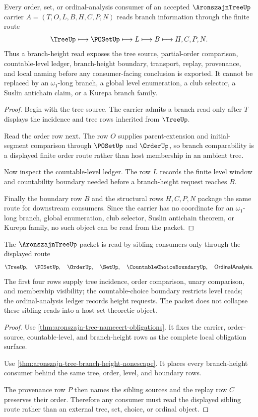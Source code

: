 \begin{theorem}\label{thm:aronszajn-tree-branch-height-nonescape}
Every order, set, or ordinal-analysis consumer of an accepted $\AronszajnTreeUp$ carrier $A=(T,O,L,B,H,C,P,N)$ reads branch information through the finite route
$$
\TreeUp \longmapsto \POSetUp \longmapsto L \longmapsto B \longmapsto H,C,P,N .
$$
Thus a branch-height read exposes the tree source, partial-order comparison, countable-level ledger, branch-height boundary, transport, replay, provenance, and local naming before any consumer-facing conclusion is exported. It cannot be replaced by an $\omega_1$-long branch, a global level enumeration, a club selector, a Suslin antichain claim, or a Kurepa branch family.
\end{theorem}
\begin{proof}
Begin with the tree source. The carrier admits a branch read only after $T$ displays the incidence and tree rows inherited from $\TreeUp$.

Read the order row next. The row $O$ supplies parent-extension and initial-segment comparison through $\POSetUp$ and $\OrderUp$, so branch comparability is a displayed finite order route rather than host membership in an ambient tree.

Now inspect the countable-level ledger. The row $L$ records the finite level window and countability boundary needed before a branch-height request reaches $B$.

Finally the boundary row $B$ and the structural rows $H,C,P,N$ package the same route for downstream consumers. Since the carrier has no coordinate for an $\omega_1$-long branch, global enumeration, club selector, Suslin antichain theorem, or Kurepa family, no such object can be read from the packet.
\end{proof}

\begin{theorem}\label{thm:aronszajn-tree-sibling-route}
The $\AronszajnTreeUp$ packet is read by sibling consumers only through the displayed route
$$
\TreeUp,\quad \POSetUp,\quad \OrderUp,\quad \SetUp,\quad \CountableChoiceBoundaryUp,\quad \mathsf{OrdinalAnalysis}.
$$
The first four rows supply tree incidence, order comparison, unary comparison, and membership visibility; the countable-choice boundary restricts level reads; the ordinal-analysis ledger records height requests. The packet does not collapse these sibling reads into a host set-theoretic object.
\end{theorem}
\begin{proof}
Use \autoref{thm:aronszajn-tree-namecert-obligations}. It fixes the carrier, order-source, countable-level, and branch-height rows as the complete local obligation surface.

Use \autoref{thm:aronszajn-tree-branch-height-nonescape}. It places every branch-height consumer behind the same tree, order, level, and boundary rows.

The provenance row $P$ then names the sibling sources and the replay row $C$ preserves their order. Therefore any consumer must read the displayed sibling route rather than an external tree, set, choice, or ordinal object.
\end{proof}

